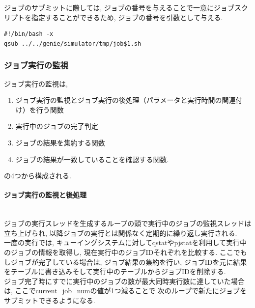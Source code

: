 ジョブのサブミットに際しては, ジョブの番号を与えることで一意にジョブスクリプトを指定することができるため,
ジョブの番号を引数として与える.\\
{\footnotesize
\begin{lstlisting}[caption=ジョブのサブミットスクリプト, frame=single]
#!/bin/bash -x
qsub ../../genie/simulator/tmp/job$1.sh
\end{lstlisting}
}

\subsubsection{ジョブ実行の監視}
ジョブ実行の監視は,
\begin{enumerate}
\item ジョブ実行の監視とジョブ実行の後処理（パラメータと実行時間の関連付け）を行う関数
\item 実行中のジョブの完了判定
\item ジョブの結果を集約する関数
\item ジョブの結果が一致していることを確認する関数.
\end{enumerate}
の4つから構成される.\\
\paragraph{ジョブ実行の監視と後処理}~\\

ジョブの実行スレッドを生成するループの頭で実行中のジョブの監視スレッドは立ち上げられ,
以降ジョブの実行とは関係なく定期的に繰り返し実行される.\\
一度の実行では, キューイングシステムに対してqstatやpjstatを利用して実行中のジョブの情報を取得し,
現在実行中のジョブIDそれぞれを比較する. ここでもしジョブが完了している場合は,
ジョブ結果の集約を行い, ジョブIDを元に結果をテーブルに書き込みそして実行中のテーブルからジョブIDを削除する.\\
ジョブ完了時にすでに実行中のジョブの数が最大同時実行数に達していた場合は, ここでcurrent\_job\_numの値が1つ減ることで
次のループで新たにジョブをサブミットできるようになる.\\


